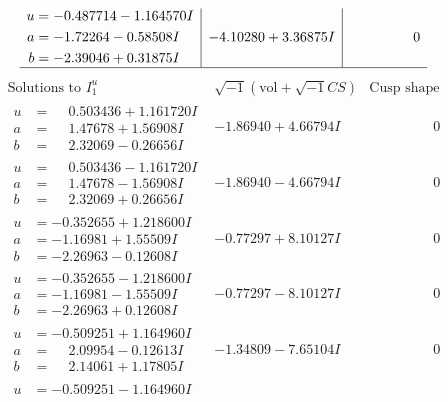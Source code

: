 \documentclass[1p]{elsarticle_modified}
\theoremstyle{definition}
\newcommand{\I}{\sqrt{-1}}
\begin{document}
$$\begin{array}{c|c|c}
\begin{aligned}
u &= -0.487714 - 1.164570 I \\
a &= -1.72264 - 0.58508 I \\
b &= -2.39046 + 0.31875 I\end{aligned}
 & -4.10280 + 3.36875 I & \phantom{-0.000000 } 0\\
 \hline 
 \end{array}$$\newpage$$\begin{array}{c|c|c}  
\text{Solutions to }I^u_{1}& \I (\text{vol} + \sqrt{-1}CS) & \text{Cusp shape}\\
 \hline 
\begin{aligned}
u &= \phantom{-}0.503436 + 1.161720 I \\
a &= \phantom{-}1.47678 + 1.56908 I \\
b &= \phantom{-}2.32069 - 0.26656 I\end{aligned}
 & -1.86940 + 4.66794 I & \phantom{-0.000000 } 0 \\ \hline\begin{aligned}
u &= \phantom{-}0.503436 - 1.161720 I \\
a &= \phantom{-}1.47678 - 1.56908 I \\
b &= \phantom{-}2.32069 + 0.26656 I\end{aligned}
 & -1.86940 - 4.66794 I & \phantom{-0.000000 } 0 \\ \hline\begin{aligned}
u &= -0.352655 + 1.218600 I \\
a &= -1.16981 + 1.55509 I \\
b &= -2.26963 - 0.12608 I\end{aligned}
 & -0.77297 + 8.10127 I & \phantom{-0.000000 } 0 \\ \hline\begin{aligned}
u &= -0.352655 - 1.218600 I \\
a &= -1.16981 - 1.55509 I \\
b &= -2.26963 + 0.12608 I\end{aligned}
 & -0.77297 - 8.10127 I & \phantom{-0.000000 } 0 \\ \hline\begin{aligned}
u &= -0.509251 + 1.164960 I \\
a &= \phantom{-}2.09954 - 0.12613 I \\
b &= \phantom{-}2.14061 + 1.17805 I\end{aligned}
 & -1.34809 - 7.65104 I & \phantom{-0.000000 } 0 \\ \hline\begin{aligned}
u &= -0.509251 - 1.164960 I \\

\end{aligned}
\end{array}$$
\end{document}
